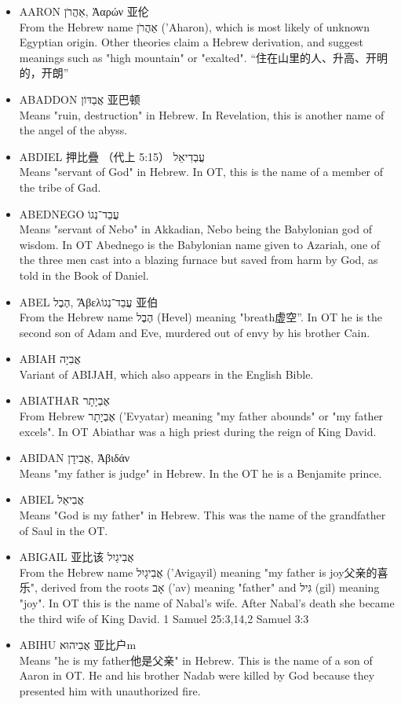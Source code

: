 \begin{itemize}
\itemsep-.45em  
\item {AARON אַהֲרֹן, Ἀαρών  亚伦} \\
From the Hebrew name אַהֲרֹן ('Aharon), which is most likely of unknown Egyptian origin. Other theories claim a Hebrew derivation, and suggest meanings such as "high mountain" or "exalted". “住在山里的人、升高、开明的，开朗”
\item {ABADDON אֲבַדּוֹן 亚巴顿} \\
Means "ruin, destruction" in Hebrew. In Revelation, this is another name of the angel of the abyss.
\item {ABDIEL 押比疊 （代上 5:15）  עֲבְדִיאֵל} \\
Means "servant of God" in Hebrew. In OT, this is the name of a member of the tribe of Gad. 
\item {ABEDNEGO עֲבֵד־נְגוֹ} \\
Means "servant of Nebo" in Akkadian, Nebo being the Babylonian god of wisdom. In OT Abednego is the Babylonian name given to Azariah, one of the three men cast into a blazing furnace but saved from harm by God, as told in the Book of Daniel.
\item {ABEL הֶבֶל, Ἄβελעֲבֵד־נְגוֹ  亚伯} \\
From the Hebrew name הֶבֶל (Hevel) meaning "breath虚空”. In OT he is the second son of Adam and Eve, murdered out of envy by his brother Cain. 
\item {ABIAH אֲבִיָה} \\
Variant of ABIJAH, which also appears in the English Bible.
\item {ABIATHAR אֶבְיָתָר} \\
From Hebrew אֶבְיָתָר ('Evyatar) meaning "my father abounds" or "my father excels". In OT Abiathar was a high priest during the reign of King David.
\item {ABIDAN אֲבִידָן, Ἀβιδάν} \\
Means "my father is judge" in Hebrew. In the OT he is a Benjamite prince.
\item {ABIEL אֲבִיאֵל} \\
Means "God is my father" in Hebrew. This was the name of the grandfather of Saul in the OT.
\item {ABIGAIL 亚比该  אֲבִיגַיִל} \\
From the Hebrew name אֲבִיגָיִל ('Avigayil) meaning "my father is joy父亲的喜乐", derived from the roots אָב ('av) meaning "father" and גִּיל (gil) meaning "joy". In OT this is the name of Nabal's wife. After Nabal's death she became the third wife of King David. 1 Samuel 25:3,14,2 Samuel 3:3
\item {ABIHU אֲבִיהוּא 亚比户m}\\
Means "he is my father他是父亲" in Hebrew. This is the name of a son of Aaron in OT. He and his brother Nadab were killed by God because they presented him with unauthorized fire.


\end{itemize}
